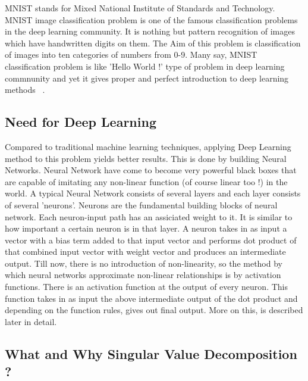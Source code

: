 MNIST stands for Mixed National Institute of Standards and Technology. MNIST
image classification problem is one of the famous classification problems in the
deep learning community. It is nothing but pattern recognition of images which
have handwritten digits on them. The Aim of this problem is classification of
images into ten categories of numbers from 0-9. Many say, MNIST classification
problem is like 'Hello World !' type of problem in deep learning commnunity and
yet it gives proper and perfect introduction to deep learning methods
~\cite{hid-sp18-401-mnist}.

\subsection{Need for Deep Learning}

Compared to traditional machine learning techniques, applying Deep Learning
method to this problem yields better results. This is done by building Neural
Networks. Neural Network have come to become very powerful black boxes that are
capable of imitating any non-linear function (of course linear too !) in the
world. A typical Neural Network consists of several layers and each layer
consists of several 'neurons'. Neurons are the fundamental building blocks of
neural network.  Each neuron-input path has an assiciated weight to it. It is
similar to how important a certain neuron is in that layer. A neuron takes in as
input a vector with a bias term added to that input vector and performs dot
product of that combined input vector with weight vector and produces an
intermediate output. Till now, there is no introduction of non-linearity, so the
method by which neural networks approximate non-linear relationships is by
activation functions. There is an activation function at the output of every
neuron. This function takes in as input the above intermediate output of the dot
product and depending on the function rules, gives out final output. More on
this, is described later in detail.

\subsection{What and Why Singular Value Decomposition ?}

